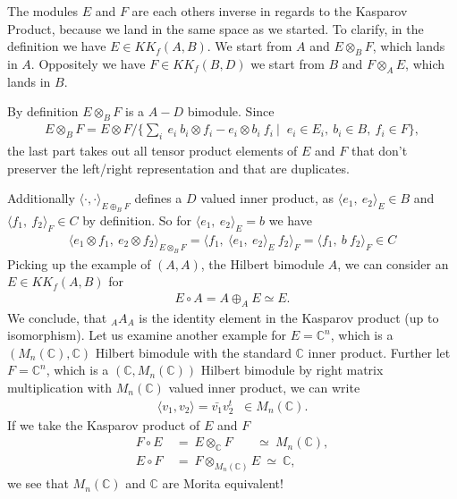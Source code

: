 The modules $E$ and $F$ are each others inverse in regards to the Kasparov
Product, because we land in the same space as we started. To clarify, in
the definition we have $E \in KK_f(A, B)$. We start from $A$ and $E \otimes
_B F$, which lands in $A$. Oppositely we have $F \in KK_f(B, D)$ we start
from $B$ and $F \otimes _A E$, which lands in $B$.


By definition  $E \otimes _B F$ is a $A-D$ bimodule. Since
\begin{align}
    E \otimes _B F = E \otimes F / \bigg\{\sum_i\ e_i\ b_i \otimes f_i - e_i
        \otimes b_i\ f_i\ \big|\;\; e_i \in E_i,\ b_i \in B,\ f_i \in F\bigg\},
\end{align}
the last part takes out all tensor product elements of $E$ and $F$ that don't
preserver the left/right representation and that are duplicates.

Additionally $\langle \cdot,\cdot\rangle _{E\oplus _B F}$ defines a $D$ valued
inner product, as $\langle e_1,\ e_2\rangle _E \in B$ and $\langle f_1,\ f_2\rangle _F \in C$ by
definition. So for $\langle e_1,\ e_2\rangle _E =b$ we have
\begin{align}
    \langle e_1 \otimes f_1,\ e_2 \otimes f_2\rangle _{E\otimes _B F} = \langle
    f_1,\ \langle e_1,\ e_2\rangle _E\ f_2\rangle _F = \langle f_1,\ b\ f_2\rangle _F \in C
\end{align}
Picking up the example of $(A, A)$, the Hilbert bimodule $A$, we can
consider an $E \in KK_f(A,B)$ for
\begin{align}
    E \circ A = A\oplus _A E \simeq E.
\end{align}
We conclude, that $_A A_A$ is the identity element in the Kasparov product (up
to isomorphism).
Let us examine another example for $E = \mathbb{C}^n$, which is a
$(M_n(\mathbb{C}), \mathbb{C})$ Hilbert bimodule with the standard $\mathbb{C}$
inner product. Further let $F = \mathbb{C}^n$, which is a $(\mathbb{C},
M_n(\mathbb{C}))$ Hilbert bimodule by right matrix multiplication with
$M_n(\mathbb{C})$ valued inner product, we can write
    \begin{align}
        \langle v_1, v_2\rangle =\bar{v_1}v_2^t \;\; \in M_n(\mathbb{C}).
    \end{align}
If we take the Kasparov product of $E$ and $F$
   \begin{align}
       F\circ E\ &=\  E\otimes _{\mathbb{C}}F\ \;\;\;\;\;\; \simeq \
        M_n(\mathbb{C}),\\
        E\circ F\ &=\ F\otimes _{M_n(\mathbb{C})}E\ \simeq\ \mathbb{C},
    \end{align}
we see that $M_n(\mathbb{C})$ and $\mathbb{C}$ are Morita equivalent!

